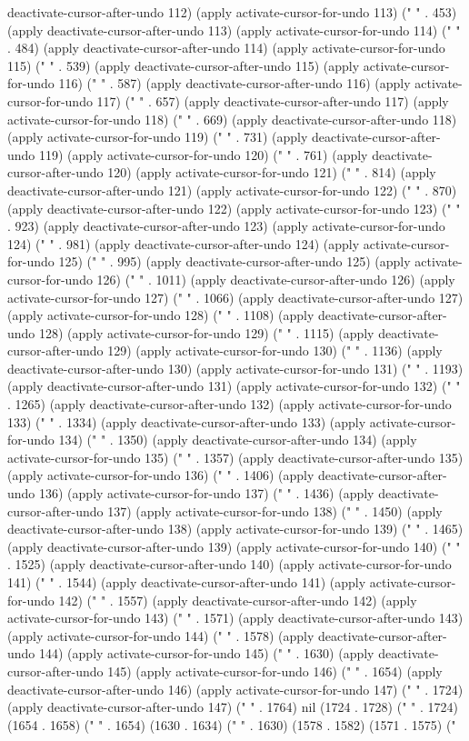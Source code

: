 deactivate-cursor-after-undo 112) (apply activate-cursor-for-undo 113) (" " . 453) (apply deactivate-cursor-after-undo 113) (apply activate-cursor-for-undo 114) (" " . 484) (apply deactivate-cursor-after-undo 114) (apply activate-cursor-for-undo 115) (" " . 539) (apply deactivate-cursor-after-undo 115) (apply activate-cursor-for-undo 116) (" " . 587) (apply deactivate-cursor-after-undo 116) (apply activate-cursor-for-undo 117) (" " . 657) (apply deactivate-cursor-after-undo 117) (apply activate-cursor-for-undo 118) (" " . 669) (apply deactivate-cursor-after-undo 118) (apply activate-cursor-for-undo 119) (" " . 731) (apply deactivate-cursor-after-undo 119) (apply activate-cursor-for-undo 120) (" " . 761) (apply deactivate-cursor-after-undo 120) (apply activate-cursor-for-undo 121) (" " . 814) (apply deactivate-cursor-after-undo 121) (apply activate-cursor-for-undo 122) (" " . 870) (apply deactivate-cursor-after-undo 122) (apply activate-cursor-for-undo 123) (" " . 923) (apply deactivate-cursor-after-undo 123) (apply activate-cursor-for-undo 124) (" " . 981) (apply deactivate-cursor-after-undo 124) (apply activate-cursor-for-undo 125) (" " . 995) (apply deactivate-cursor-after-undo 125) (apply activate-cursor-for-undo 126) (" " . 1011) (apply deactivate-cursor-after-undo 126) (apply activate-cursor-for-undo 127) (" " . 1066) (apply deactivate-cursor-after-undo 127) (apply activate-cursor-for-undo 128) (" " . 1108) (apply deactivate-cursor-after-undo 128) (apply activate-cursor-for-undo 129) (" " . 1115) (apply deactivate-cursor-after-undo 129) (apply activate-cursor-for-undo 130) (" " . 1136) (apply deactivate-cursor-after-undo 130) (apply activate-cursor-for-undo 131) (" " . 1193) (apply deactivate-cursor-after-undo 131) (apply activate-cursor-for-undo 132) (" " . 1265) (apply deactivate-cursor-after-undo 132) (apply activate-cursor-for-undo 133) (" " . 1334) (apply deactivate-cursor-after-undo 133) (apply activate-cursor-for-undo 134) (" " . 1350) (apply deactivate-cursor-after-undo 134) (apply activate-cursor-for-undo 135) (" " . 1357) (apply deactivate-cursor-after-undo 135) (apply activate-cursor-for-undo 136) (" " . 1406) (apply deactivate-cursor-after-undo 136) (apply activate-cursor-for-undo 137) (" " . 1436) (apply deactivate-cursor-after-undo 137) (apply activate-cursor-for-undo 138) (" " . 1450) (apply deactivate-cursor-after-undo 138) (apply activate-cursor-for-undo 139) (" " . 1465) (apply deactivate-cursor-after-undo 139) (apply activate-cursor-for-undo 140) (" " . 1525) (apply deactivate-cursor-after-undo 140) (apply activate-cursor-for-undo 141) (" " . 1544) (apply deactivate-cursor-after-undo 141) (apply activate-cursor-for-undo 142) (" " . 1557) (apply deactivate-cursor-after-undo 142) (apply activate-cursor-for-undo 143) (" " . 1571) (apply deactivate-cursor-after-undo 143) (apply activate-cursor-for-undo 144) (" " . 1578) (apply deactivate-cursor-after-undo 144) (apply activate-cursor-for-undo 145) (" " . 1630) (apply deactivate-cursor-after-undo 145) (apply activate-cursor-for-undo 146) (" " . 1654) (apply deactivate-cursor-after-undo 146) (apply activate-cursor-for-undo 147) (" " . 1724) (apply deactivate-cursor-after-undo 147) (" " . 1764) nil (1724 . 1728) (" " . 1724) (1654 . 1658) (" " . 1654) (1630 . 1634) (" " . 1630) (1578 . 1582) (1571 . 1575) (" 